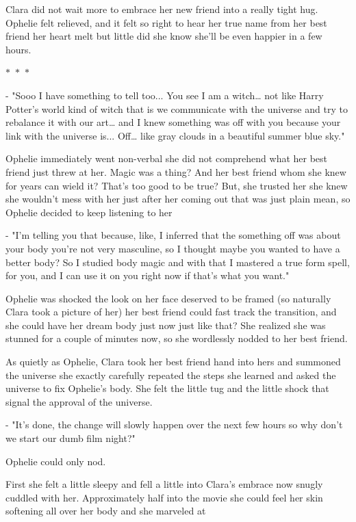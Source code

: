 \documentclass[hidelinks,12pt]{book}
\newcommand\sep{\begin{center}
  \boldmath $\ast$~$\ast$~$\ast$
\end{center}}
\begin{document}
Clara did not wait more to embrace her new friend into a really tight hug. Ophelie felt relieved, 
and it felt so right to hear her true name from her best friend her heart melt but little did she know she'll 
be even happier in a few hours.

\sep

- "Sooo I have something to tell too... You see I am a witch… not like Harry Potter's world kind of witch that is we 
communicate with the universe and try to rebalance it with our art… and I knew something was off with you because 
your link with the universe is... Off… like gray clouds in a beautiful summer blue sky."\par 
\bigskip
Ophelie immediately went non-verbal she did not comprehend what her best friend just threw at her. Magic was a thing? 
And her best friend whom she knew for years can wield it? That's too good to be true? But, she trusted her she knew she 
wouldn't mess with her just after her coming out that was just plain mean, so Ophelie decided to keep listening to her\par
\bigskip
- "I'm telling you that because, like, I inferred that the something off was about your body you're not very masculine, 
so I thought maybe you wanted to have a better body? So I studied body magic and with that I mastered a true form spell, 
for you, and I can use it on you right now if that's what you want."\par 
\bigskip
Ophelie was shocked the look on her face deserved to be framed (so naturally Clara took a picture of her) her best 
friend could fast track the transition, and she could have her dream body just now just like that? She realized 
she was stunned for a couple of minutes now, so she wordlessly nodded to her best friend.\par
\bigskip
As quietly as Ophelie, Clara took her best friend hand into hers and summoned the universe she exactly carefully 
repeated the steps she learned and asked the universe to fix Ophelie's body. She felt the little tug and the little 
shock that signal the approval of the universe.\par 
\bigskip
- "It's done, the change will slowly happen over the next few hours so why don't we start our dumb film night?"\par 
Ophelie could only nod.\par 
\bigskip
First she felt a little sleepy and fell a little into Clara's embrace now snugly cuddled with her. 
Approximately half into the movie she could feel her skin softening all over her body and she marveled at 
\end{document}
